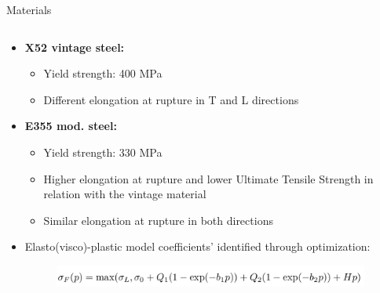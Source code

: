 \documentclass[9pt]{beamer}
\begin{document}
\begin{frame}{Materials}

\begin{columns}
\begin{column}{0.65\textwidth}

\begin{itemize}
	\item \textbf{X52 vintage steel:}
	\vspace{0.3cm}
	\begin{itemize}
		\item Yield strength: 400 MPa
		\vspace{0.3cm}
		\item Different elongation at rupture in T and L directions
	\end{itemize}
	
	\vspace{0.35cm}
	
	\item \textbf{E355 mod. steel:}
	
	\vspace{0.3cm}
	
	\begin{itemize}
		\item Yield strength: 330 MPa
		\vspace{0.3cm}
		\item Higher elongation at rupture and lower Ultimate Tensile Strength in relation with the vintage material
		\vspace{0.cm}
		\item Similar elongation at rupture in both directions
	\end{itemize}
	
	\vspace{0.35cm}	
	
	\item Elasto(visco)-plastic model coefficients' identified through optimization: \\
	
	\begin{figure}
	\centering
	\includegraphics[width=0.98\textwidth]{Images/voce_law.png} \\
\end{figure}

\end{itemize}

\end{column}


\end{columns}
\end{frame}
\end{document}
